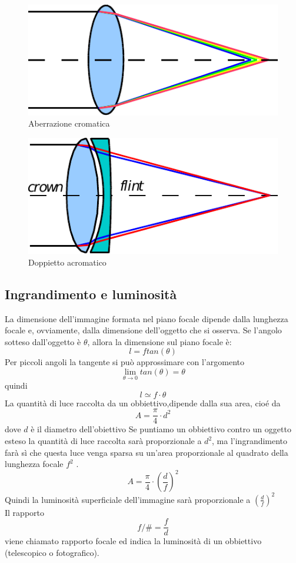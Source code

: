 \begin{figure}

\centering
\includegraphics{img/aberrazione-cromatica.pdf}

\caption{Aberrazione cromatica}
\label{fig:aberrazione-cromatica}
\end{figure}


\begin{figure}

\centering
\includegraphics{img/doppietto-acromatico.pdf}

\caption{Doppietto acromatico}
\label{fig:doppietto-acromatico}
\end{figure}

\subsection{Ingrandimento e luminosità}

La dimensione dell'immagine formata nel piano focale dipende dalla lunghezza
focale e, ovviamente, dalla dimensione dell'oggetto che si osserva. Se
l'angolo sotteso dall'oggetto è $\theta$, allora la dimensione sul piano
focale è: 
\[l = f tan(\theta)\]
Per piccoli angoli la tangente si può approssimare con l'argomento
\[\lim_{\theta \to 0} tan(\theta) = \theta \]
quindi 
\[l \simeq f \cdot \theta\]
La quantità di luce raccolta da un obbiettivo,dipende dalla sua area, cioé da 
\[A=\frac{\pi}{4} \cdot d^2\]
dove $d$ è il diametro dell'obiettivo
Se puntiamo un obbiettivo contro un oggetto esteso la quantità di luce raccolta sarà proporzionale a $d^2$,
ma l'ingrandimento farà sì che questa luce venga sparsa su un'area proporzionale al quadrato della lunghezza focale $f^2$ .
\[A=\frac{\pi}{4} \cdot \left(\frac{d}{f}\right)^2 \]
Quindi la luminosità superficiale dell'immagine sarà proporzionale a $\left(\frac{d}{f}\right)^2 $
\\
Il rapporto 
\[ f/\# = \frac{f}{d} \] 
viene chiamato rapporto focale ed indica la luminosità di un obbiettivo (telescopico o fotografico).

